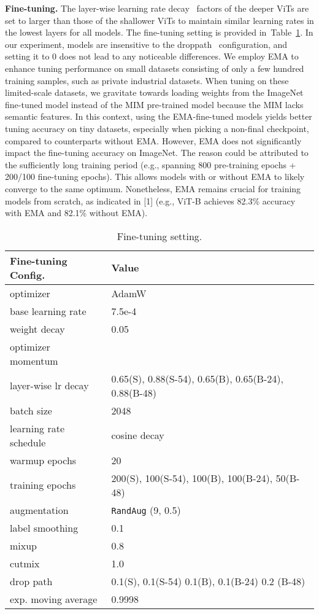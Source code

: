 \documentclass{article}
\begin{document}
\textbf{Fine-tuning.} The layer-wise learning rate decay~\cite{clark2020pre} factors of the deeper ViTs are set to larger than those of the shallower ViTs to maintain similar learning rates in the lowest layers for all models. The fine-tuning setting is provided in~Table~\ref{tab: impl_ft}. In our experiment, models are insensitive to the droppath~\cite{huang2016deep} configuration, and setting it to 0 does not lead to any noticeable differences.  
We employ EMA to enhance tuning performance on small datasets consisting of only a few hundred training samples, such as private industrial datasets. When tuning on these limited-scale datasets, we gravitate towards loading weights from the ImageNet fine-tuned model instead of the MIM pre-trained model because the MIM lacks semantic features. In this context, using the EMA-fine-tuned models yields better tuning accuracy on tiny datasets, especially when picking a non-final checkpoint, compared to counterparts without EMA.
However, EMA does not significantly impact the fine-tuning accuracy on ImageNet. The reason could be attributed to the sufficiently long training period (e.g., spanning 800 pre-training epochs + 200/100 fine-tuning epochs). This allows models with or without EMA to likely converge to the same optimum. Nonetheless, EMA remains crucial for training models from scratch, as indicated in [1] (e.g., ViT-B achieves 82.3\% accuracy with EMA and 82.1\% without EMA).
\begin{table}[htb]
\small
\renewcommand{\arraystretch}{1.1}
\begin{tabular}{@{}l  l@{}}
\toprule
Fine-tuning Config. & Value \\
\midrule
optimizer & AdamW \\
base learning rate & 7.5e-4 \\
weight decay & 0.05 \\
optimizer momentum &  \\
layer-wise lr decay~\cite{clark2020pre} &  0.65(S), 0.88(S-54), 0.65(B), 0.65(B-24), 0.88(B-48) \\ 
batch size & 2048 \\
learning rate schedule & cosine decay \\
warmup epochs & 20 \\
training epochs &  200(S), 100(S-54), 100(B), 100(B-24), 50(B-48) \\
augmentation & \texttt{RandAug} (9, 0.5) \cite{cubuk2020randaugment} \\
label smoothing \cite{szegedy2016rethinking} & 0.1 \\
mixup \cite{zhang2017mixup} & 0.8 \\
cutmix \cite{yun2019cutmix} & 1.0 \\
drop path \cite{huang2016deep} & 0.1(S), 0.1(S-54) 0.1(B), 0.1(B-24) 0.2 (B-48) \\
exp. moving average  & 0.9998 \\
\bottomrule
\end{tabular}
\caption{Fine-tuning setting.}
\label{tab: impl_ft}
\end{table}
\end{document}
